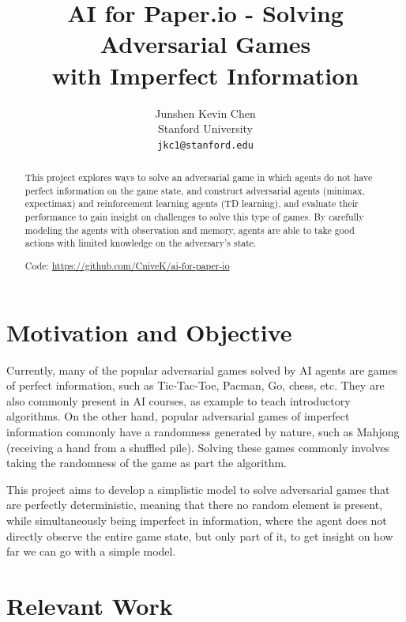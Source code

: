 \documentclass{article}
\title{ AI for Paper.io - Solving Adversarial Games \\ with Imperfect Information }
\author{
  Junshen Kevin Chen \\
  Stanford University\\
  \texttt{jkc1@stanford.edu}
}
\begin{document}
\maketitle

\begin{abstract}

This project explores ways to solve an adversarial game in which agents do not have perfect information on the game state, and construct adversarial agents (minimax, expectimax) and reinforcement learning agents (TD learning), and evaluate their performance to gain insight on challenges to solve this type of games. By carefully modeling the agents with observation and memory, agents are able to take good actions with limited knowledge on the adversary's state. 

Code: \href{https://github.com/CniveK/ai-for-paper-io}{https://github.com/CniveK/ai-for-paper-io}

\end{abstract}


\section{Motivation and Objective}

Currently, many of the popular adversarial games solved by AI agents are games of perfect information, such as Tic-Tac-Toe, Pacman, Go, chess, etc. They are also commonly present in AI courses, as example to teach introductory algorithms. 
On the other hand, popular adversarial games of imperfect information commonly have a randomness generated by nature, such as Mahjong (receiving a hand from a shuffled pile). Solving these games commonly involves taking the randomness of the game as part the algorithm. 

This project aims to develop a simplistic model to solve adversarial games that are perfectly deterministic, meaning that there no random element is present, while simultaneously being imperfect in information, where the agent does not directly observe the entire game state, but only part of it, to get insight on how far we can go with a simple model.

\section{Relevant Work}
\end{document}

